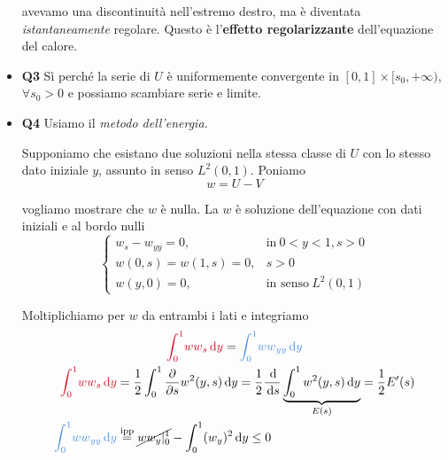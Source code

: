 \begin{itemize}
avevamo una discontinuità nell'estremo destro, ma è diventata \textit{istantaneamente} regolare. Questo è l'\textbf{effetto regolarizzante} dell'equazione del calore.
\item \textbf{Q3} Sì perché la serie di $U$ è uniformemente convergente in $[ 0,1] \times [ s_{0},+\infty)$, $\forall s_{0}  >0$ e possiamo scambiare serie e limite.
\item \textbf{Q4} Usiamo il \textit{metodo dell'energia.}

Supponiamo che esistano due soluzioni nella stessa classe di $U$ con lo stesso dato iniziale $y$, assunto in senso $L^{2}(0,1)$. Poniamo
\begin{equation*}
    w=U-V
\end{equation*}

vogliamo mostrare che $w$ è nulla. La $w$ è soluzione dell'equazione con dati iniziali e al bordo nulli
\begin{equation*}
    \begin{cases}
        w_{s} -w_{yy} =0,  & \text{in} \ 0< y< 1,s >0     \\
        w(0,s) =w(1,s) =0, & \boxed{s >0}                 \\
        w(y,0) =0,         & \text{in senso} \ L^{2}(0,1)
    \end{cases}
\end{equation*}

Moltiplichiamo per $w$ da entrambi i lati e integriamo
\begin{gather*}
    \textcolor[rgb]{0.82,0.01,0.11}{\int ^{1}_{0}}\textcolor[rgb]{0.82,0.01,0.11}{ww}\textcolor[rgb]{0.82,0.01,0.11}{_{s}}\textcolor[rgb]{0.82,0.01,0.11}{\dy} =\textcolor[rgb]{0.29,0.56,0.89}{\int ^{1}_{0}}\textcolor[rgb]{0.29,0.56,0.89}{ww}\textcolor[rgb]{0.29,0.56,0.89}{_{yy}}\textcolor[rgb]{0.29,0.56,0.89}{\dy}\\
    \begin{aligned}
        \textcolor[rgb]{0.82,0.01,0.11}{\int ^{1}_{0}}\textcolor[rgb]{0.82,0.01,0.11}{ww}\textcolor[rgb]{0.82,0.01,0.11}{_{s}}\textcolor[rgb]{0.82,0.01,0.11}{\dy}  & =\frac{1}{2}\int ^{1}_{0}\frac{\partial }{\partial s} w^{2}(y,s) \dy=\frac{1}{2}\frac{\de}{\ds}\underbrace{\int ^{1}_{0} w^{2}(y,s) \dy}_{E(s)} =\frac{1}{2} E'(s) \\
        \textcolor[rgb]{0.29,0.56,0.89}{\int ^{1}_{0}}\textcolor[rgb]{0.29,0.56,0.89}{ww}\textcolor[rgb]{0.29,0.56,0.89}{_{yy}}\textcolor[rgb]{0.29,0.56,0.89}{\dy} & \overset{\text{ipp}}{=}\cancel{ww_{y} |^{1}_{0}} -\int ^{1}_{0}(w_{y})^{2} \dy\leq 0
    \end{aligned}
\end{gather*}


\end{itemize}
